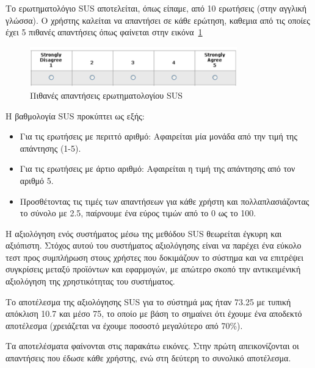 Το ερωτηματολόγιο SUS αποτελείται, όπως είπαμε, από 10 ερωτήσεις (στην αγγλική γλώσσα). Ο χρήστης καλείται να απαντήσει σε κάθε ερώτηση, καθεμια από τις οποίες έχει 5 πιθανές απαντήσεις όπως φαίνεται στην εικόνα~\ref{fig:answers}


\begin{figure}[H]
    \centering
    \includegraphics[width=0.8\textwidth]{Files/Figures/sus-responses.pdf}
    \caption[Πιθανές απαντήσεις ερωτηματολογίου SUS]{Πιθανές απαντήσεις ερωτηματολογίου SUS}
    \label{fig:answers}
\end{figure}




Η βαθμολογία SUS προκύπτει ως εξής:
\begin{itemize}
\item Για τις ερωτήσεις με περιττό αριθμό: Αφαιρείται μία μονάδα από την τιμή της απάντησης (1-5).
\item Για τις ερωτήσεις με άρτιο αριθμό: Αφαιρείται η τιμή της απάντησης από τον αριθμό 5.
\item  Προσθέτοντας τις τιμές των απαντήσεων για κάθε χρήστη και πολλαπλασιάζοντας το σύνολο με 2.5, παίρνουμε ένα εύρος τιμών από το 0 ως το 100.
\end{itemize}




Η αξιολόγηση ενός συστήματος μέσω της μεθόδου SUS θεωρείται έγκυρη και αξιόπιστη. Στόχος αυτού του συστήματος αξιολόγησης είναι να παρέχει ένα εύκολο τεστ προς συμπλήρωση στους χρήστες που δοκιμάζουν το σύστημα και να επιτρέψει συγκρίσεις μεταξύ προϊόντων και εφαρμογών, με απώτερο σκοπό την αντικειμένική αξιολόγηση της χρηστικότητας του συστήματος. 


Το αποτέλεσμα της αξιολόγησης SUS για το σύστημά μας ήταν 73.25 με τυπική απόκλιση 10.7 και μέσο 75, το οποίο με βάση το \cite{bangor2008empirical} σημαίνει ότι έχουμε ένα αποδεκτό αποτέλεσμα (χρειάζεται να έχουμε ποσοστό μεγαλύτερο από 70\%).


Τα αποτελέσματα φαίνονται στις παρακάτω εικόνες. Στην πρώτη απεικονίζονται οι απαντήσεις που έδωσε κάθε χρήστης, ενώ στη δεύτερη το συνολικό αποτέλεσμα.

